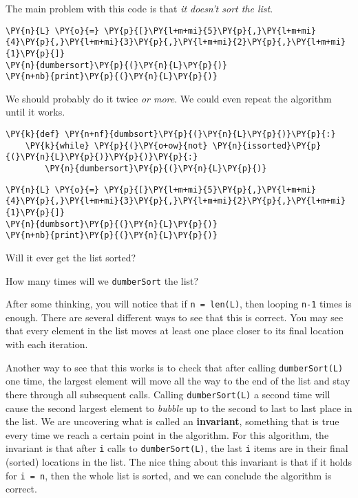 The main problem with this code is that \emph{it doesn't sort the list}.

\begin{Verbatim}[commandchars=\\\{\}]
\PY{n}{L} \PY{o}{=} \PY{p}{[}\PY{l+m+mi}{5}\PY{p}{,}\PY{l+m+mi}{4}\PY{p}{,}\PY{l+m+mi}{3}\PY{p}{,}\PY{l+m+mi}{2}\PY{p}{,}\PY{l+m+mi}{1}\PY{p}{]}
\PY{n}{dumbersort}\PY{p}{(}\PY{n}{L}\PY{p}{)}
\PY{n+nb}{print}\PY{p}{(}\PY{n}{L}\PY{p}{)}
\end{Verbatim}



We should probably do it twice \emph{or more}.  We could even repeat the algorithm until it works.

\begin{Verbatim}[commandchars=\\\{\}]
\PY{k}{def} \PY{n+nf}{dumbsort}\PY{p}{(}\PY{n}{L}\PY{p}{)}\PY{p}{:}
    \PY{k}{while} \PY{p}{(}\PY{o+ow}{not} \PY{n}{issorted}\PY{p}{(}\PY{n}{L}\PY{p}{)}\PY{p}{)}\PY{p}{:}
        \PY{n}{dumbersort}\PY{p}{(}\PY{n}{L}\PY{p}{)}
\end{Verbatim}


\begin{Verbatim}[commandchars=\\\{\}]
\PY{n}{L} \PY{o}{=} \PY{p}{[}\PY{l+m+mi}{5}\PY{p}{,}\PY{l+m+mi}{4}\PY{p}{,}\PY{l+m+mi}{3}\PY{p}{,}\PY{l+m+mi}{2}\PY{p}{,}\PY{l+m+mi}{1}\PY{p}{]}
\PY{n}{dumbsort}\PY{p}{(}\PY{n}{L}\PY{p}{)}
\PY{n+nb}{print}\PY{p}{(}\PY{n}{L}\PY{p}{)}
\end{Verbatim}



Will it ever get the list sorted?  


How many times will we \texttt{dumberSort} the list?


After some thinking, you will notice that if \texttt{n = len(L)}, then looping \texttt{n-1} times is enough.  There are several different ways to see that this is correct.  You may see that every element in the list moves at least one place closer to its final location with each iteration.  


Another way to see that this works is to check that after calling \texttt{dumberSort(L)} one time, the largest element will move all the way to the end of the list and stay there through all subsequent calls.  Calling \texttt{dumberSort(L)} a second time will cause the second largest element to \emph{bubble} up to the second to last to last place in the list.  We are uncovering what is called an \textbf{invariant}, something that is true every time we reach a certain point in the algorithm.  For this algorithm, the invariant is that after \texttt{i} calls to \texttt{dumberSort(L)}, the last \texttt{i} items are in their final (sorted) locations in the list.  The nice thing about this invariant is that if it holds for \texttt{i = n}, then the whole list is sorted, and we can conclude the algorithm is correct.


